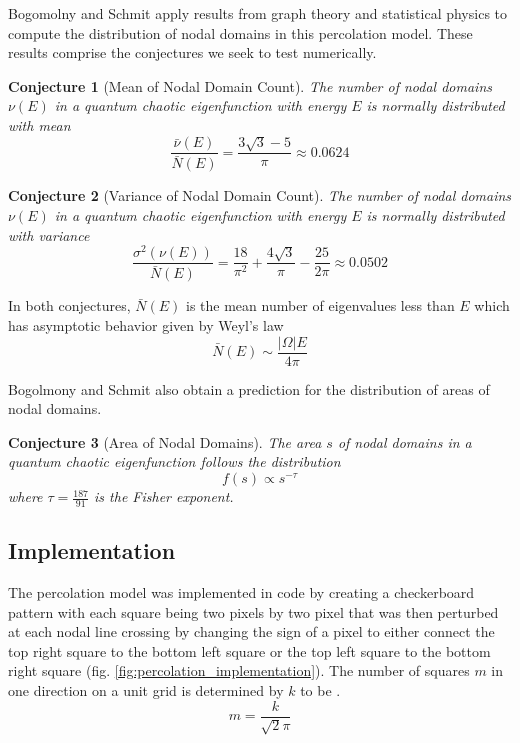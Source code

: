 \documentclass{report}
\begin{document}
Bogomolny and Schmit apply results from graph theory and statistical physics to compute the distribution of nodal domains in this percolation model. These results comprise the conjectures we seek to test numerically.

\newtheorem{conj}{Conjecture}
\begin{conj}[Mean of Nodal Domain Count]
  \label{conj:mean}
  The number of nodal domains $\nu(E)$ in a quantum chaotic eigenfunction with energy $E$ is normally distributed with mean
  \begin{equation}
    \frac{\bar{\nu}(E)}{\bar{N}(E)} = \frac{3 \sqrt{3} - 5}{\pi} \approx 0.0624
  \end{equation}
\end{conj}

\begin{conj}[Variance of Nodal Domain Count]
  \label{conj:variance}
  The number of nodal domains $\nu(E)$ in a quantum chaotic eigenfunction with energy $E$ is normally distributed with variance
  \begin{equation}
    \frac{\sigma^{2}(\nu(E))}{\bar{N}(E)} = \frac{18}{\pi^{2}} + \frac{4 \sqrt{3}}{\pi} - \frac{25}{2 \pi} \approx 0.0502
  \end{equation}
\end{conj}  

In both conjectures, $\bar{N}(E)$ is the mean number of eigenvalues less than $E$ which has asymptotic behavior given by Weyl's law \cite{garabedian}
\begin{equation}
  \label{eq:weyl}
  \bar{N}(E) \sim \frac{\vert \Omega \vert E}{4 \pi}
\end{equation}

Bogolmony and Schmit also obtain a prediction for the distribution of areas of nodal domains.

\begin{conj}[Area of Nodal Domains]
  \label{conj:area}
  The area $s$ of nodal domains in a quantum chaotic eigenfunction follows the distribution
  \begin{equation}
    f(s) \propto s^{-\tau}
  \end{equation}
  where $\tau = \frac{187}{91}$ is the Fisher exponent.
\end{conj}

\subsection{Implementation}
The percolation model was implemented in code by creating a checkerboard pattern with each square being two pixels by two pixel that was then perturbed at each nodal line crossing by changing the sign of a pixel to either connect the top right square to the bottom left square or the top left square to the bottom right square (fig. \ref{fig:percolation_implementation}). The number of squares $m$ in one direction on a unit grid is determined by $k$ to be \cite{bogomolny}.
\[
m = \frac{k}{\sqrt{2}\pi}
\]
\end{document}
